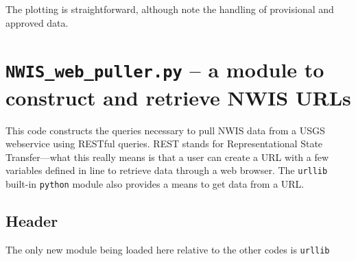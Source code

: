 \documentclass[12pt]{article}
\begin{document}
The plotting is straightforward, although note the handling of provisional and approved data.
\begin{center}
	
\end{center}

\section{\texttt{NWIS\_web\_puller.py} -- a module to construct and retrieve NWIS URLs}
This code constructs the queries necessary to pull NWIS data from a USGS webservice using RESTful queries. REST stands for Representational State Transfer---what this really means is that a user can create a URL with a few variables defined in line to retrieve data through a web browser. The \texttt{urllib} built-in \texttt{python} module also provides a means to get data from a URL.
\subsection{Header}
The only new module being loaded here relative to the other codes is \texttt{urllib}
\begin{center}
	
\end{center}
\end{document}
